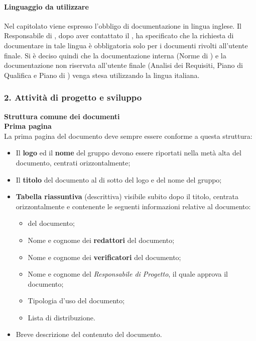   \paragraph*{Linguaggio da utilizzare}
  Nel capitolato viene espresso l'obbligo di documentazione in lingua inglese. Il Responsabile di , dopo aver contattato il , ha specificato che la richiesta di documentare in tale lingua è obbligatoria solo per i documenti rivolti all'utente finale. Si è deciso quindi che la documentazione interna (Norme di ) e la documentazione non riservata all'utente finale (Analisi dei Requisiti, Piano di Qualifica e Piano di ) venga stesa utilizzando la lingua italiana.  





\subsubsection{2. Attivit\`a di progetto e sviluppo}   %
  \textbf{Struttura comune dei documenti} \\
      \textbf{Prima pagina} \\   
      La prima pagina del documento deve sempre essere conforme a questa struttura:
      \begin{itemize}
      \item Il \textbf{logo} ed il \textbf{nome} del gruppo devono essere riportati nella metà alta del documento, centrati orizzontalmente;
      \item Il \textbf{titolo} del documento al di sotto del logo e del nome del gruppo;
      \item \textbf{Tabella riassuntiva} (descrittiva) visibile subito dopo il titolo, centrata orizzontalmente e contenente
		le seguenti informazioni relative al documento:
        \begin{itemize}
        \item {} del documento;
        \item Nome e cognome dei \textbf{redattori} del documento;
        \item Nome e cognome dei \textbf{verificatori} del documento;
        \item Nome e cognome del \textit{Responsabile di Progetto}, il quale approva il documento;
        \item Tipologia d'uso del documento;
        \item Lista di distribuzione.
        \end{itemize}
    \item Breve descrizione del contenuto del documento.
      \end{itemize}

